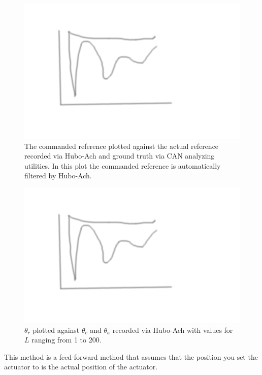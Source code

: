 \begin{figure}[thpb]
  \centering
\includegraphics[width=0.8\columnwidth]{./pix/tmp.png}
  \caption{The commanded reference plotted against the actual reference recorded via Hubo-Ach and ground truth via CAN analyzing utilities.  In this plot the commanded reference is automatically filtered by Hubo-Ach.}
  \label{fig:singleJointStepFiltered}
\end{figure}

\begin{figure}[thpb]
  \centering
\includegraphics[width=0.8\columnwidth]{./pix/tmp.png}
  \caption{$\theta_r$ plotted against $\theta_c$ and $\theta_a$ recorded via Hubo-Ach with values for $L$ ranging from 1 to 200.}
  \label{fig:singleJointStepFilteredLtest}
\end{figure}

This method is a feed-forward method that assumes that the position you set the actuator to is the actual position of the actuator.
